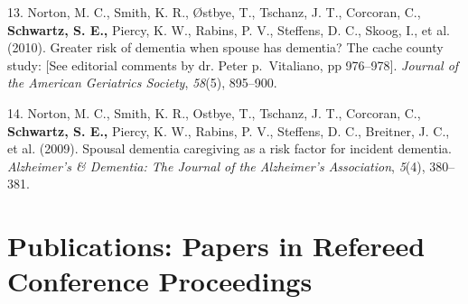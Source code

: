 \documentclass[11pt,a4paper,]{moderncv}
\newlength{\cslhangindent}
\newenvironment{CSLReferences}[2] %
 {\begin{list}{}{%
  \setlength{\itemindent}{0pt}
  \setlength{\leftmargin}{0pt}
  \setlength{\parsep}{0pt}
  \ifodd #1
   \setlength{\leftmargin}{\cslhangindent}
   \setlength{\itemindent}{-1\cslhangindent}
  \fi
  \setlength{\itemsep}{#2\baselineskip}}}
 {\end{list}}
\begin{document}
\begin{CSLReferences}{1}{0}
13. Norton, M. C., Smith, K. R., Østbye, T., Tschanz, J. T., Corcoran,
C., \textbf{Schwartz, S. E.,} Piercy, K. W., Rabins, P. V., Steffens, D.
C., Skoog, I., et al. (2010). Greater risk of dementia when spouse has
dementia? The cache county study: {[}See editorial comments by dr. Peter
p.~Vitaliano, pp 976--978{]}. \emph{Journal of the American Geriatrics
Society}, \emph{58}(5), 895--900.

14. Norton, M. C., Smith, K. R., Ostbye, T., Tschanz, J. T., Corcoran,
C., \textbf{Schwartz, S. E.,} Piercy, K. W., Rabins, P. V., Steffens, D.
C., Breitner, J. C., et al. (2009). Spousal dementia caregiving as a
risk factor for incident dementia. \emph{Alzheimer's \& Dementia: The
Journal of the Alzheimer's Association}, \emph{5}(4), 380--381.

\end{CSLReferences}

\endgroup

\vspace{7mm}

\section{Publications: Papers in Refereed Conference
Proceedings}\label{publications-papers-in-refereed-conference-proceedings}

\begingroup
\setlength{\parindent}{-0.5in}
\setlength{\leftskip}{0.5in}
\end{document}
